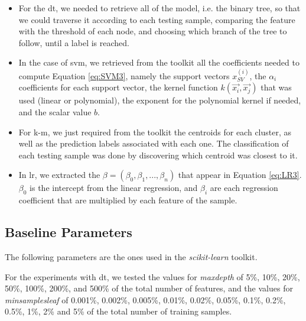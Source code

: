 \begin{itemize}
  
    \item For the \ac{dt}, we needed to retrieve all of the model, i.e. the binary tree, so that we could traverse it according to each testing sample, comparing the feature with the threshold of each node, and choosing which branch of the tree to follow, until a label is reached. 

    \item In the case of \ac{svm}, we retrieved from the toolkit all the coefficients needed to compute Equation \ref{eq:SVM3}, namely the support vectors $x_{SV}^{(i)}$, the $\alpha_i$ coefficients for each support vector, the kernel function $k({\vec {x_{i}}},{\vec {x_{j}}})$ that was used (linear or polynomial), the exponent for the polynomial kernel if needed, and the scalar value $b$.


    \item For \ac{k-m}, we just required from the toolkit the centroids for each cluster, as well as the prediction labels associated with each one. The classification of each testing sample was done by discovering which centroid was closest to it.

    \item In \ac{lr}, we extracted the $\beta=(\beta_0,\beta_1,...,\beta_n)$ that appear in Equation \ref{eq:LR3}. $\beta_0$ is the intercept from the linear regression, and $\beta_i$ are each regression coefficient that are multiplied by each feature of the sample.

\end{itemize}


\subsection{Baseline Parameters}

The following parameters are the ones used in the \textit{scikit-learn} toolkit.

For the experiments with \ac{dt}, we tested the values for \textit{max\textunderscore depth} of 5\%, 10\%, 20\%, 50\%, 100\%, 200\%, and 500\% of the total number of features, and the values for \textit{min\textunderscore samples\textunderscore leaf} of 0.001\%, 0.002\%, 0.005\%, 0.01\%, 0.02\%, 0.05\%, 0.1\%, 0.2\%, 0.5\%, 1\%, 2\% and 5\% of the total number of training samples.

